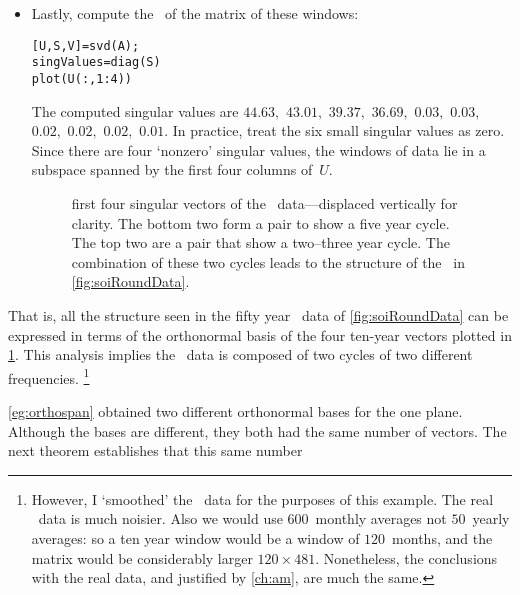 \begin{example}
\begin{itemize}
\item Lastly, compute the \svd\ of the matrix of these windows:
\begin{verbatim}
[U,S,V]=svd(A);
singValues=diag(S)
plot(U(:,1:4))
\end{verbatim}
\setbox\ajrqrbox\hbox{}%
\marginajrbox%
The computed singular values are $44.63,$ $43.01,$ $39.37,$ $36.69,$ $0.03,$ $0.03,$ $0.02,$ $0.02,$ $0.02,$ $0.01$.
In practice, treat the six small singular values as zero.
Since there are four `nonzero' singular values, the windows of data lie in a subspace spanned by the first four columns of~\(U\).
\begin{figure}
\centering

\caption{first four singular vectors of the \soi\ data---displaced vertically for clarity.  
The bottom two form a pair to show a five year cycle.  
The top two are a pair that show a two--three year cycle.  
The combination of these two cycles leads to the structure of the \soi\ in \cref{fig:soiRoundData}.}
\label{fig:soiRoundSubs}
\end{figure}%
\end{itemize}
That is, all the structure seen in the fifty year \soi\ data of \cref{fig:soiRoundData} can be expressed in terms of the  orthonormal basis of the four ten-year vectors plotted in \cref{fig:soiRoundSubs}.
This analysis implies the \soi\ data is composed of two cycles of two different frequencies.%
\footnote{However, I `smoothed' the \soi\ data for the purposes of this example.  The real \soi\ data is much noisier.  
Also we would use \(600\)~monthly averages not \(50\)~yearly averages: so a ten year window would be a window of \(120\)~months, and the matrix would be considerably larger \(120\times481\).  
Nonetheless, the conclusions with the real data, and justified by \cref{ch:am}, are much the same.}
\end{example}



\cref{eg:orthospan} obtained two different orthonormal bases for the one plane.  
Although the bases are different, they both had the same number of vectors.
The next theorem establishes that this same number 

